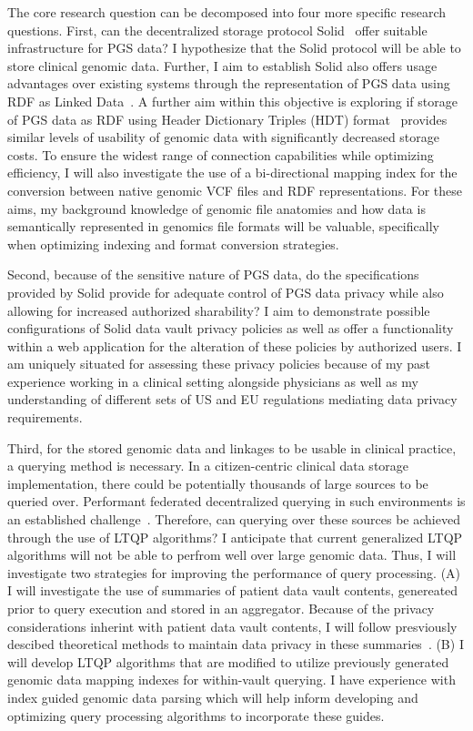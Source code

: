 \documentclass[a4paper,11pt]{article}
\begin{document}
\begin{refsection}
The core research question can be decomposed into four more specific research questions.
First, can the decentralized storage protocol Solid~\cite{solid}
offer suitable infrastructure for PGS data? 
I hypothesize that the Solid protocol will be able to store clinical genomic data.
Further, I aim to establish Solid also offers usage advantages over existing systems through the representation of PGS data using RDF as Linked Data~\cite{berners-lee_linked_2009}.
A further aim within this objective is exploring if storage of PGS data as RDF using Header Dictionary Triples (HDT) format~\cite{hdt} provides similar levels of usability of genomic data with significantly decreased storage costs.
To ensure the widest range of connection capabilities while optimizing efficiency, I will also investigate the use of a bi-directional mapping index for the conversion between native genomic VCF files and RDF representations.
For these aims, my background knowledge of genomic file anatomies and how data is semantically represented in genomics file formats will be valuable, specifically when optimizing indexing and format conversion strategies.

Second, because of the sensitive nature of PGS data, do the specifications provided by Solid provide for adequate control of PGS data privacy while also allowing for increased authorized sharability?
I aim to demonstrate possible configurations of Solid data vault privacy policies as well as offer a functionality within a web application for the alteration of these policies by authorized users.
I am uniquely situated for assessing these privacy policies because of my past experience working in a clinical setting alongside physicians as well as my understanding of different sets of US and EU regulations mediating data privacy requirements.

Third, for the stored genomic data and linkages to be usable in clinical practice, a querying method is necessary.
In a citizen-centric clinical data storage implementation, there could be potentially thousands of large sources to be queried over.
Performant federated decentralized querying in such environments is an established challenge~\cite{dang_fedshop_2023}.
Therefore, can querying over these sources be achieved through the use of LTQP algorithms?
I anticipate that current generalized LTQP algorithms will not be able to perfrom well over large genomic data.
Thus, I will investigate two strategies for improving the performance of query processing.
(A) I will investigate the use of summaries of patient data vault contents, genereated prior to query execution and stored in an aggregator.
Because of the privacy considerations inherint with patient data vault contents, I will follow presviously descibed theoretical methods to maintain data privacy in these summaries~\cite{taelman_privacyAgg_2020}.
(B) I will develop LTQP algorithms that are modified to utilize previously generated genomic data mapping indexes for within-vault querying.
I have experience with index guided genomic data parsing which will help inform developing and optimizing query processing algorithms to incorporate these guides. 


\end{refsection}
\end{document}
